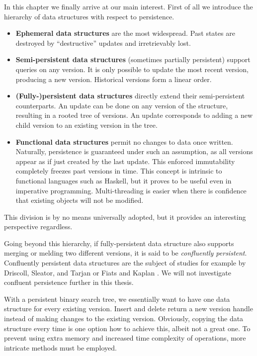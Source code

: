 In this chapter we finally arrive at our main interest. First of all we introduce the hierarchy of data structures with respect to persistence.

\begin{itemize}
\item {\bfseries Ephemeral data structures} are the most widespread. 
Past states are destroyed by ``destructive” updates and irretrievably lost.
\item {\bfseries Semi-persistent data structures} (sometimes partially persistent) 
support queries on any version. It is only possible to update the most recent version, producing a new version. 
Historical versions form a linear order. 
\item {\bfseries (Fully-)persistent data structures} directly extend their semi-persistent counterparts. 
An update can be done on any version of the structure, resulting in a rooted tree of versions. 
An update corresponds to adding a new child version to an existing version in the tree.
\item {\bfseries Functional data structures} permit no changes to data once written. 
Naturally, persistence is guaranteed under such an assumption, 
as all versions appear as if just created by the last update.
This enforced immutability completely freezes past versions in time.
This concept is intrinsic to functional languages such as Haskell, 
but it proves to be useful even in imperative programming. 
Multi-threading is easier when there is confidence that existing objects will not be modified.
\end{itemize}

This division is by no means universally adopted, but it provides an interesting perspective regardless.

Going beyond this hierarchy, if fully-persistent data structure also supports merging or melding two different versions, it is said to be \emph{confluently persistent}. 
Confluently persistent data structures are the subject of studies for example by Driscoll, Sleator, and Tarjan \cite{confluently-persistent-a} or Fiats and Kaplan \cite{confluently-persistent-b}. 
We will not investigate confluent persistence further in this thesis.

With a persistent binary search tree, we essentially want to have one data structure for every existing version. 
Insert and delete return a new version handle instead of making changes to the existing version. 
Obviously, copying the data structure every time is one option how to achieve this, albeit not a great one. 
To prevent using extra memory and increased time complexity of operations, more intricate methods must be employed.

